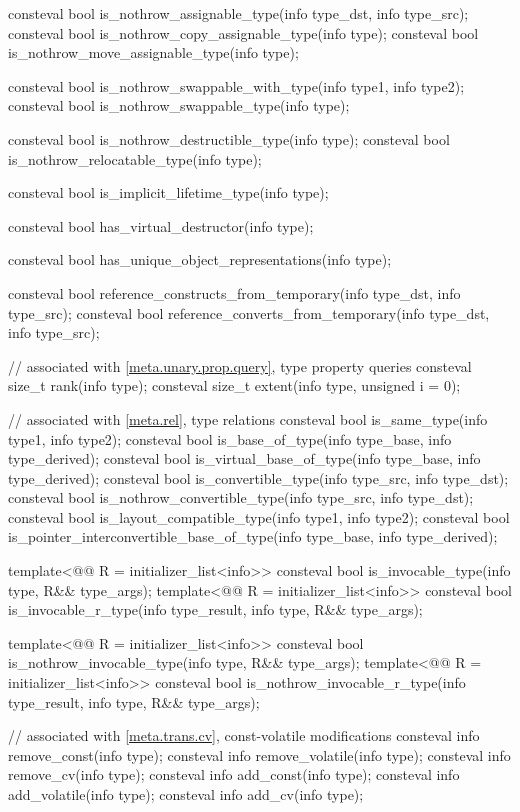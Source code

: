 \begin{codeblock}
{  consteval bool is_nothrow_assignable_type(info type_dst, info type_src);
  consteval bool is_nothrow_copy_assignable_type(info type);
  consteval bool is_nothrow_move_assignable_type(info type);

  consteval bool is_nothrow_swappable_with_type(info type1, info type2);
  consteval bool is_nothrow_swappable_type(info type);

  consteval bool is_nothrow_destructible_type(info type);
  consteval bool is_nothrow_relocatable_type(info type);

  consteval bool is_implicit_lifetime_type(info type);

  consteval bool has_virtual_destructor(info type);

  consteval bool has_unique_object_representations(info type);

  consteval bool reference_constructs_from_temporary(info type_dst, info type_src);
  consteval bool reference_converts_from_temporary(info type_dst, info type_src);

  // associated with \ref{meta.unary.prop.query}, type property queries
  consteval size_t rank(info type);
  consteval size_t extent(info type, unsigned i = 0);

  // associated with \ref{meta.rel}, type relations
  consteval bool is_same_type(info type1, info type2);
  consteval bool is_base_of_type(info type_base, info type_derived);
  consteval bool is_virtual_base_of_type(info type_base, info type_derived);
  consteval bool is_convertible_type(info type_src, info type_dst);
  consteval bool is_nothrow_convertible_type(info type_src, info type_dst);
  consteval bool is_layout_compatible_type(info type1, info type2);
  consteval bool is_pointer_interconvertible_base_of_type(info type_base, info type_derived);

  template<@@ R = initializer_list<info>>
    consteval bool is_invocable_type(info type, R&& type_args);
  template<@@ R = initializer_list<info>>
    consteval bool is_invocable_r_type(info type_result, info type, R&& type_args);

  template<@@ R = initializer_list<info>>
    consteval bool is_nothrow_invocable_type(info type, R&& type_args);
  template<@@ R = initializer_list<info>>
    consteval bool is_nothrow_invocable_r_type(info type_result, info type, R&& type_args);

  // associated with \ref{meta.trans.cv}, const-volatile modifications
  consteval info remove_const(info type);
  consteval info remove_volatile(info type);
  consteval info remove_cv(info type);
  consteval info add_const(info type);
  consteval info add_volatile(info type);
  consteval info add_cv(info type);

}
\end{codeblock}
